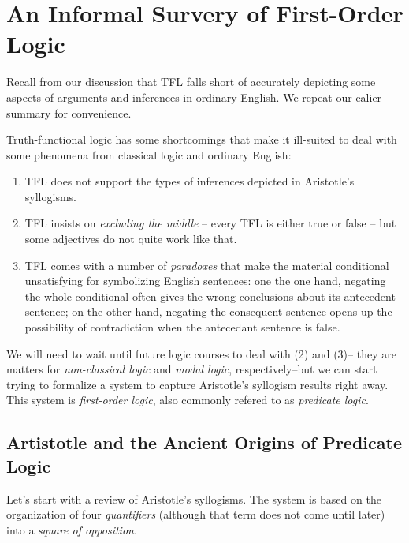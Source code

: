 
\section{An Informal Survery of First-Order Logic}

Recall from our discussion that TFL falls short of accurately depicting some
aspects of arguments and inferences in ordinary English. We repeat our ealier
summary for convenience.

\begin{observation}
  Truth-functional logic has some shortcomings that make it ill-suited to deal
  with some phenomena from classical logic and ordinary English:\\
  \begin{enumerate}
  \item TFL does not support the types of inferences depicted in Aristotle's
    syllogisms.
  \item TFL insists on \emph{excluding the middle} -- every TFL is either true
    or false -- but some adjectives do not quite work like that.
  \item TFL comes with a number of \emph{paradoxes} that make the material
    conditional unsatisfying for symbolizing English sentences: one the one
    hand, negating the whole conditional often gives the wrong conclusions
    about its antecedent sentence; on the other hand, negating the consequent
    sentence opens up the possibility of contradiction when the antecedant
    sentence is false.
  \end{enumerate}
\end{observation}

We will need to wait until future logic courses to deal with (2) and (3)--
they are matters for \emph{non-classical logic} and \emph{modal logic},
respectively--but we can start trying to formalize a system to capture
Aristotle's syllogism results right away. This system is \emph{first-order
logic}, also commonly refered to as \emph{predicate logic}.

\subsection{Artistotle and the Ancient Origins of Predicate Logic}

Let's start with a review of Aristotle's syllogisms. The system is based on
the organization of four \emph{quantifiers} (although that term does not
come until later) into a \emph{square of opposition}.

